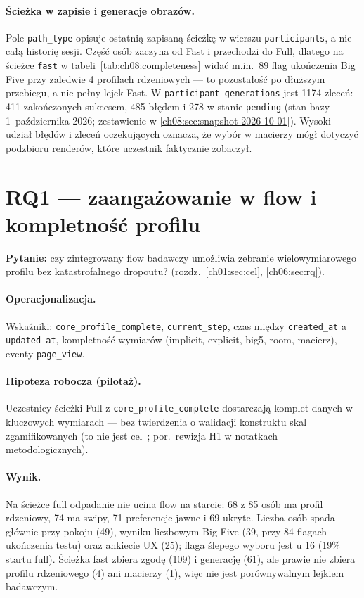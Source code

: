 \paragraph{Ścieżka w zapisie i generacje obrazów.}
Pole \texttt{path\_type} opisuje ostatnią zapisaną ścieżkę w wierszu \texttt{participants}, a nie całą historię sesji. Część osób zaczyna od Fast i przechodzi do Full, dlatego na ścieżce \texttt{fast} w tabeli~\ref{tab:ch08:completeness} widać m.in.\ 89 flag ukończenia Big Five przy zaledwie 4 profilach rdzeniowych --- to pozostałość po dłuższym przebiegu, a nie pełny lejek Fast. W \texttt{participant\_generations} jest 1174 zleceń: 411 zakończonych sukcesem, 485 błędem i 278 w stanie \texttt{pending} (stan bazy 1~października 2026; zestawienie w \cref{ch08:sec:snapshot-2026-10-01}). Wysoki udział błędów i zleceń oczekujących oznacza, że wybór w macierzy mógł dotyczyć podzbioru renderów, które uczestnik faktycznie zobaczył.

\section{RQ1 --- zaangażowanie w flow i kompletność profilu}
\label{ch08:sec:rq1}

\textbf{Pytanie:} czy zintegrowany flow badawczy umożliwia zebranie wielowymiarowego profilu bez katastrofalnego dropoutu? (rozdz.~\ref{ch01:sec:cel}, \ref{ch06:sec:rq}).

\paragraph{Operacjonalizacja.}
Wskaźniki: \texttt{core\_profile\_complete}, \texttt{current\_step}, czas między \texttt{created\_at} a \texttt{updated\_at}, kompletność wymiarów (implicit, explicit, big5, room, macierz), eventy \texttt{page\_view}.

\paragraph{Hipoteza robocza (pilotaż).}
Uczestnicy ścieżki Full z \texttt{core\_profile\_complete} dostarczają komplet danych w kluczowych wymiarach --- bez twierdzenia o walidacji konstruktu skal zgamifikowanych (to nie jest cel~; por.\ rewizja H1 w notatkach metodologicznych).

\paragraph{Wynik.}
Na ścieżce full odpadanie nie ucina flow na starcie: 68 z 85 osób ma profil rdzeniowy, 74 ma swipy, 71 preferencje jawne i 69 ukryte. Liczba osób spada głównie przy pokoju (49), wyniku liczbowym Big Five (39, przy 84 flagach ukończenia testu) oraz ankiecie UX (25); flaga ślepego wyboru jest u 16 (19\% startu full). Ścieżka fast zbiera zgodę (109) i generację (61), ale prawie nie zbiera profilu rdzeniowego (4) ani macierzy (1), więc nie jest porównywalnym lejkiem badawczym.

